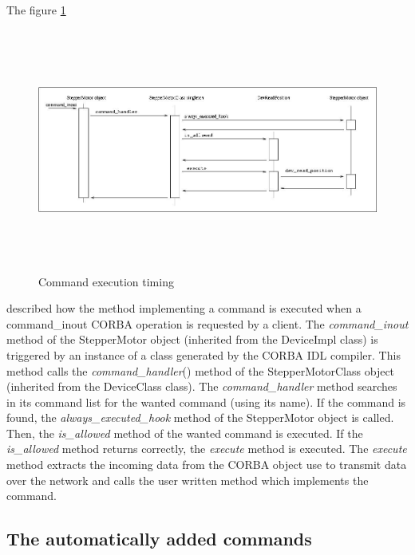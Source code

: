 The figure \ref{command_timing_fig}
\begin{figure}[H]
\begin{centering}
\includegraphics[width=14cm,height=8cm]{ds_writing/command}
\par\end{centering}
\caption{Command execution timing\label{command_timing_fig}}
\end{figure}
 described how the method implementing a command is executed when
a command\_inout CORBA operation is requested
by a client. The \emph{command\_inout} method of the StepperMotor
object (inherited from the DeviceImpl class) is triggered by an instance
of a class generated by the CORBA IDL compiler. This
method calls the \emph{command\_handler}()
method of the StepperMotorClass object (inherited from the DeviceClass
class). The \emph{command\_handler} method searches in its command
list for the wanted command (using its name). If the command is found,
the \emph{always\_executed\_hook} method
of the StepperMotor object is called. Then, the \emph{is\_allowed}
method of the wanted command is executed. If the \emph{is\_allowed}
method returns correctly, the \emph{execute} method
is executed. The \emph{execute} method extracts the incoming data
from the CORBA object use to transmit data over the network and calls
the user written method which implements the command.

\subsection{The automatically added commands\label{Auto_cmd}}

